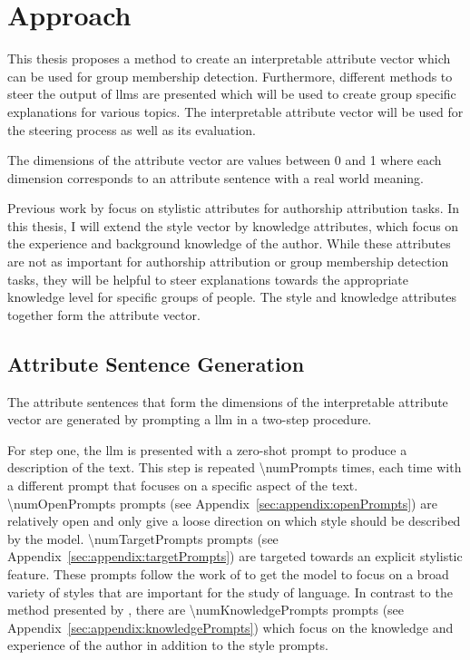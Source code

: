 \chapter{Approach}
\label{sec:approach}

This thesis proposes a method to create an interpretable attribute vector which can be used for group membership detection. Furthermore, different methods to steer the output of \acp{llm} are presented which will be used to create group specific explanations for various topics. The interpretable attribute vector will be used for the steering process as well as its evaluation.

The dimensions of the attribute vector are values between \num{0} and \num{1} where each dimension corresponds to an attribute sentence with a real world meaning.

Previous work by \citet{patelLearningInterpretableStyle2023,alshomaryLatentSpaceInterpretation2024} focus on stylistic attributes for authorship attribution tasks. In this thesis, I will extend the style vector by knowledge attributes, which focus on the experience and background knowledge of the author. While these attributes are not as important for authorship attribution or group membership detection tasks, they will be helpful to steer explanations towards the appropriate knowledge level for specific groups of people. The style and knowledge attributes together form the attribute vector.

\section{Attribute Sentence Generation}
\label{sec:approach:attributeSentenceGeneration}

The attribute sentences that form the dimensions of the interpretable attribute vector are generated by prompting a \acf{llm} in a two-step procedure.

For step one, the \ac{llm} is presented with a zero-shot prompt to produce a description of the text. This step is repeated \num{\numPrompts} times, each time with a different prompt that focuses on a specific aspect of the text. \num{\numOpenPrompts} prompts (see Appendix~\ref{sec:appendix:openPrompts}) are relatively open and only give a loose direction on which style should be described by the model. \num{\numTargetPrompts} prompts (see Appendix~\ref{sec:appendix:targetPrompts}) are targeted towards an explicit stylistic feature. These prompts follow the work of \citet{patelLearningInterpretableStyle2023,tausczikPsychologicalMeaningWords2010} to get the model to focus on a broad variety of styles that are important for the study of language.
In contrast to the method presented by \cite{patelLearningInterpretableStyle2023}, there are \num{\numKnowledgePrompts} prompts (see Appendix~\ref{sec:appendix:knowledgePrompts}) which focus on the knowledge and experience of the author in addition to the style prompts.

